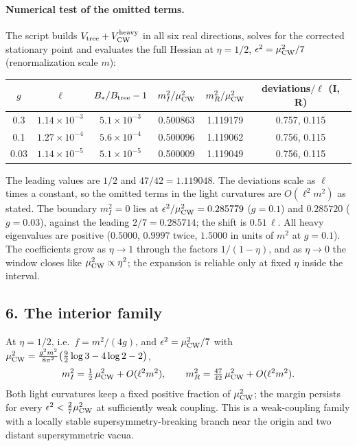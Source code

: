 \documentclass[11pt]{article}
\begin{document}
\paragraph{Numerical test of the omitted terms.} The script builds
$V_{\rm tree}+V_{\rm CW}^{\rm heavy}$ in all six real directions, solves for
the corrected stationary point and evaluates the full Hessian at $\eta=1/2$,
$\epsilon^2=\mu^2_{\rm CW}/7$ (renormalization scale $m$):
\begin{center}
\begin{tabular}{cccccc}
\toprule
$g$ & $\ell$ & $B_*/B_{\rm tree}-1$ & $m_I^2/\mu^2_{\rm CW}$ & $m_R^2/\mu^2_{\rm CW}$ & deviations$/\ell$ (I, R)\\
\midrule
0.3 & $1.14\times10^{-3}$ & $5.1\times10^{-3}$ & 0.500863 & 1.119179 & 0.757, 0.115\\
0.1 & $1.27\times10^{-4}$ & $5.6\times10^{-4}$ & 0.500096 & 1.119062 & 0.756, 0.115\\
0.03 & $1.14\times10^{-5}$ & $5.1\times10^{-5}$ & 0.500009 & 1.119049 & 0.756, 0.115\\
\bottomrule
\end{tabular}
\end{center}
The leading values are $1/2$ and $47/42=1.119048$. The deviations scale
as $\ell$ times a constant, so the omitted terms in the light curvatures
are $O(\ell^2m^2)$ as stated. The boundary $m_I^2=0$ lies at
$\epsilon^2/\mu^2_{\rm CW}=0.285779$ ($g=0.1$) and $0.285720$
($g=0.03$), against the leading $2/7=0.285714$; the shift is
$0.51\,\ell$. All heavy eigenvalues are positive ($0.5000$, $0.9997$
twice, $1.5000$ in units of $m^2$ at $g=0.1$). The coefficients grow as
$\eta\to1$ through the factors $1/(1-\eta)$, and as $\eta\to0$ the window
closes like $\mu^2_{\rm CW}\propto\eta^2$; the expansion is reliable only
at fixed $\eta$ inside the interval.

\subsection*{6. The interior family}

At $\eta=1/2$, i.e.\ $f=m^2/(4g)$, and $\epsilon^2=\mu^2_{\rm CW}/7$ with
$\mu^2_{\rm CW}=\frac{g^2m^2}{8\pi^2}\bigl(\tfrac92\log3-4\log2-2\bigr)$,
\begin{equation}
m_I^2=\tfrac12\,\mu^2_{\rm CW}+O(\ell^2m^2),\qquad
m_R^2=\tfrac{47}{42}\,\mu^2_{\rm CW}+O(\ell^2m^2).
\end{equation}
Both light curvatures keep a fixed positive fraction of $\mu^2_{\rm CW}$;
the margin persists for every $\epsilon^2<\tfrac27\mu^2_{\rm CW}$ at
sufficiently weak coupling. This is a weak-coupling family with a locally
stable supersymmetry-breaking branch near the origin and two distant
supersymmetric vacua.
\end{document}
